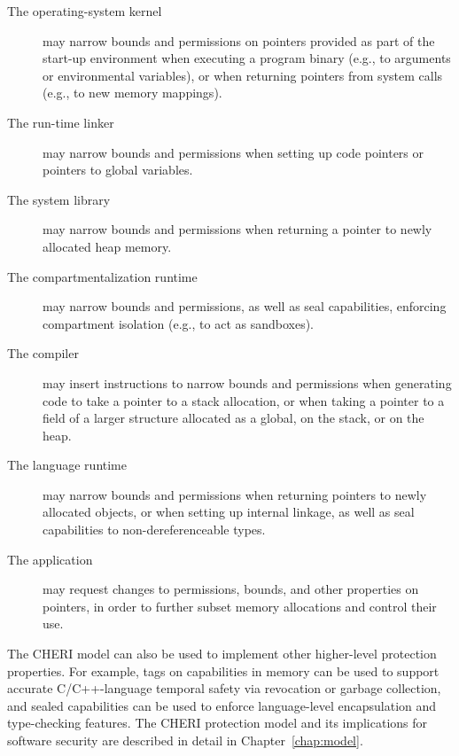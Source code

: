 \begin{description}
\item[The operating-system kernel] may narrow bounds and permissions on
  pointers provided as part of the start-up environment when executing a
  program binary (e.g., to arguments or environmental variables), or when
  returning pointers from system calls (e.g., to new memory mappings).

\item[The run-time linker] may narrow bounds and permissions when setting up
  code pointers or pointers to global variables.

\item[The system library] may narrow bounds and permissions when returning a
  pointer to newly allocated heap memory.

\item[The compartmentalization runtime] may narrow bounds and permissions,
  as well as seal capabilities, enforcing compartment isolation (e.g., to act
  as sandboxes).

\item[The compiler] may insert instructions to narrow bounds and permissions
  when generating code to take a pointer to a stack allocation, or when taking
  a pointer to a field of a larger structure allocated as a global, on the
  stack, or on the heap.

\item[The language runtime] may narrow bounds and permissions when returning
  pointers to newly allocated objects, or when setting up internal linkage, as
  well as seal capabilities to non-dereferenceable types.

\item[The application] may request changes to permissions, bounds, and other
  properties on pointers, in order to further subset memory allocations and
  control their use.
\end{description}

The CHERI model can also be used to implement other higher-level protection
properties.
For example, tags on capabilities in memory can be used to support accurate
C/C++-language temporal safety via revocation or garbage collection, and
sealed capabilities can be used to enforce language-level encapsulation and
type-checking features.
The CHERI protection model and its implications for software security are
described in detail in Chapter~\ref{chap:model}.


